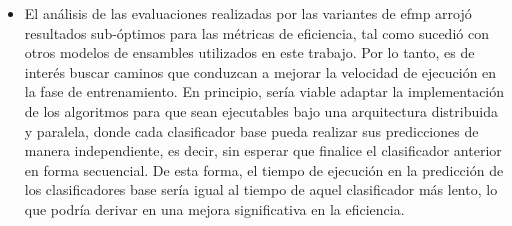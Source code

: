 \begin{itemize}
	\item El análisis de las evaluaciones realizadas por las variantes de
	      \acrshort{efmp} arrojó resultados sub-óptimos para las métricas de
	      eficiencia, tal como sucedió con otros modelos de ensambles utilizados
	      en este trabajo. Por lo tanto, es de interés buscar caminos que
	      conduzcan a mejorar la velocidad de ejecución en la fase de
	      entrenamiento. En principio, sería viable adaptar la implementación de
	      los algoritmos para que sean ejecutables bajo una arquitectura
	      distribuida y paralela, donde cada clasificador base pueda realizar sus
	      predicciones de manera independiente, es decir, sin esperar que finalice
	      el clasificador anterior en forma secuencial. De esta forma, el tiempo
	      de ejecución en la predicción de los clasificadores base sería igual al
	      tiempo de aquel clasificador más lento, lo que podría derivar en una
	      mejora significativa en la eficiencia.

\end{itemize}
